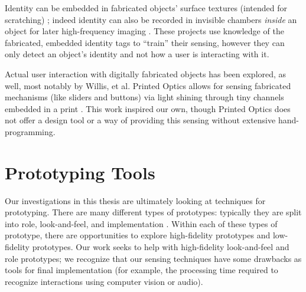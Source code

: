         Identity can be embedded in fabricated objects' surface textures (intended for scratching) \cite{harrison-acoustic}; indeed identity can also be recorded in invisible chambers \emph{inside} an object for later high-frequency imaging \cite{willis-infrastructs}. These projects use knowledge of the fabricated, embedded identity tags to ``train'' their sensing, however they can only detect an object's identity and not how a user is interacting with it.
        
        Actual user interaction with digitally fabricated objects has been explored, as well, most notably by Willis, et al. Printed Optics allows for sensing fabricated mechanisms (like sliders and buttons) via light shining through tiny channels embedded in a print \cite{willis-printedoptics}. This work inspired our own, though Printed Optics does not offer a design tool or a way of providing this sensing without extensive hand-programming.

\section{Prototyping Tools}

    Our investigations in this thesis are ultimately looking at techniques for prototyping. There are many different types of prototypes: typically they are split into role, look-and-feel, and implementation \cite{houde-prototypes}. Within each of these types of prototype, there are opportunities to explore high-fidelity prototypes and low-fidelity prototypes. Our work seeks to help with high-fidelity look-and-feel and role prototypes; we recognize that our sensing techniques have some drawbacks as tools for final implementation (for example, the processing time required to recognize interactions using computer vision or audio).
    
